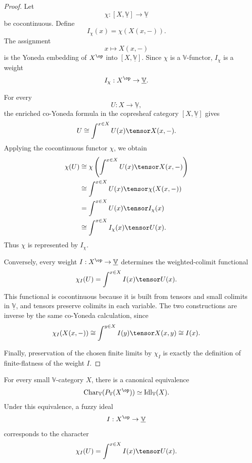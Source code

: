 \begin{proof}
Let
\[
    \chi:[X,\underline{\mathbb V}]\to\underline{\mathbb V}
\]
be cocontinuous.  Define
\[
    I_\chi(x)=\chi(X(x,-)).
\]
The assignment
\[
    x\longmapsto X(x,-)
\]
is the Yoneda embedding of \(X^{\op}\) into \([X,\underline{\mathbb V}]\).  Since
\(\chi\) is a \(\mathbb V\)-functor, \(I_\chi\) is a weight
\[
    I_\chi:X^{\op}\to\underline{\mathbb V}.
\]

For every
\[
    U:X\to\underline{\mathbb V},
\]
the enriched co-Yoneda formula in the copresheaf category
\([X,\underline{\mathbb V}]\) gives
\[
    U
    \cong
    \int^{x\in X} U(x)\tensor X(x,-).
\]
Applying the cocontinuous functor \(\chi\), we obtain
\[
\begin{aligned}
    \chi(U)
    &\cong
    \chi\left(\int^{x\in X} U(x)\tensor X(x,-)\right)\\
    &\cong
    \int^{x\in X} U(x)\tensor\chi(X(x,-))\\
    &=
    \int^{x\in X} U(x)\tensor I_\chi(x)\\
    &\cong
    \int^{x\in X} I_\chi(x)\tensor U(x).
\end{aligned}
\]
Thus \(\chi\) is represented by \(I_\chi\).

Conversely, every weight \(I:X^{\op}\to\underline{\mathbb V}\) determines the
weighted-colimit functional
\[
    \chi_I(U)=\int^{x\in X}I(x)\tensor U(x).
\]
This functional is cocontinuous because it is built from tensors and small
colimits in \(\underline{\mathbb V}\), and tensors preserve colimits in each
variable.  The two constructions are inverse by the same co-Yoneda calculation,
since
\[
    \chi_I(X(x,-))
    \cong
    \int^{y\in X}I(y)\tensor X(x,y)
    \cong
    I(x).
\]

Finally, preservation of the chosen finite limits by \(\chi_I\) is exactly the
definition of finite-flatness of the weight \(I\).
\end{proof}

\begin{theorem}
\label{thm:characters-upper-predicate-frames-flat}
For every small \(\mathbb V\)-category \(X\), there is a canonical equivalence
\[
    \operatorname{Char}_{\mathbb V}(P_{\mathbb V}(X^{\op}))
    \simeq
    \operatorname{Idl}_{\mathbb V}(X).
\]
Under this equivalence, a fuzzy ideal
\[
    I:X^{\op}\to\underline{\mathbb V}
\]
corresponds to the character
\[
    \chi_I(U)
    =
    \int^{x\in X}I(x)\tensor U(x).
\]
\end{theorem}


